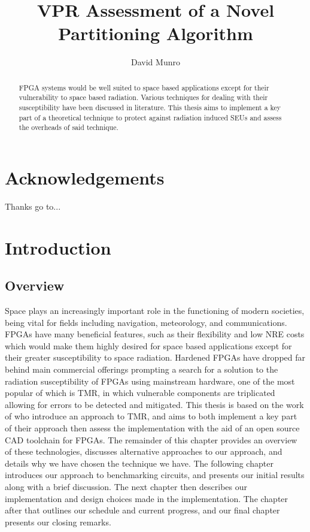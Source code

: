 \documentclass[12pt,drafta4paper,oneside]{memoir} %
\title{VPR Assessment of a Novel Partitioning Algorithm}
\author{David Munro}
\begin{document}
\maketitle
\begin{abstract}
	\ac{FPGA} systems would be well suited to space based applications except for their vulnerability to space based radiation. Various techniques for dealing with their susceptibility have been discussed in literature. This thesis aims to implement a key part of a theoretical technique to protect against radiation induced \acp{SEU} and assess the overheads of said technique.
\acresetall
\end{abstract}
\chapter*{Acknowledgements}
Thanks go to...

\newpage

\tableofcontents*
\chapter{Introduction}
\section{Overview}
Space plays an increasingly important role in the functioning of modern societies, being vital for fields including navigation, meteorology, and communications\cite{OECDSpace}. \acp{FPGA} have many beneficial features, such as their flexibility and low \ac{NRE} costs which would make them highly desired for space based applications except for their greater susceptibility to space radiation. Hardened \acp{FPGA} have dropped far behind main commercial offerings prompting a search for a solution to the radiation susceptibility of \acp{FPGA} using mainstream hardware\cite{VFPGATMR}, one of the most popular of which is \ac{TMR}, in which vulnerable components are triplicated allowing for errors to be detected and mitigated. This thesis is based on the work of\cite{DiesselChange} who introduce an approach to \ac{TMR}, and aims to both implement a key part of their approach then assess the implementation with the aid of an open source \ac{CAD} toolchain for \acp{FPGA}.
The remainder of this chapter provides an overview of these technologies, discusses alternative approaches to our approach, and details why we have chosen the technique we have. The following chapter introduces our approach to benchmarking circuits, and presents our initial results along with a brief discussion. The next chapter then describes our implementation and design choices made in the implementation. The chapter after that outlines our schedule and current progress, and our final chapter presents our closing remarks.
\acresetall
\end{document}
